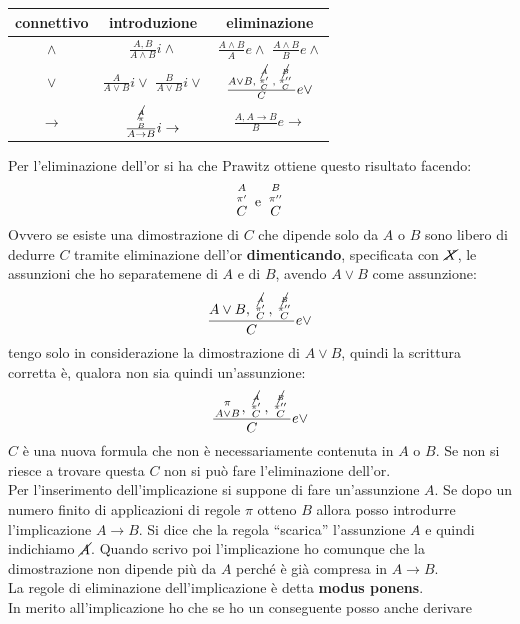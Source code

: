 \documentclass[a4paper,12pt, oneside]{book}
\newcommand*{\bfrac}[2]{\genfrac{}{}{0pt}{}{#1}{#2}}
\begin{document}
\begin{table}[H]
  \Large
  \centering
  \begin{tabular}{c||c|c}
    connettivo& introduzione & eliminazione\\
    \hline
    \hline
    $\land$ & $\frac{A,B}{A\land B}i\land$&$\frac{A\land B}{A}e\land$
                                            $\frac{A\land B}{B}e\land$\\
    \hline
    $\lor$ &$\frac{A}{A\lor B}i\lor$
             $\frac{B}{A\lor B}i\lor$&$\frac{A\lor B,
                                       \bfrac{\bfrac{\cancel{A}}{\pi'}}{C},
                                       \bfrac{\bfrac{\cancel{B}}{\pi''}}{C}}{C}
                                       e\lor$\\
    \hline
    $\to$ & $\frac{\bfrac{\cancel{A}}
            {\bfrac{\pi}{B}}}{A\to B}i\to$ & $\frac{A,A\to B}{B}e\to$\\
    \hline
  \end{tabular}
\end{table}
Per l'eliminazione dell'or si ha che Prawitz ottiene questo risultato facendo:
\[\bfrac{\bfrac{A}{\pi'}}{C}\mbox{ e }\bfrac{\bfrac{B}{\pi''}}{C}\]
Ovvero se esiste una dimostrazione di $C$ che dipende solo da $A$ o $B$ sono
libero di dedurre $C$ tramite eliminazione dell'or \textbf{dimenticando},
specificata con $\cancel{X}$, le
assunzioni che ho separatemene di $A$ e di $B$, avendo $A\lor B$ come
assunzione: 
\[\frac{A\lor B,\bfrac{\bfrac{\cancel{A}}{\pi'}}{C},
    \bfrac{\bfrac{\cancel{B}}{\pi''}}{C}}{C}e\lor\]
tengo solo in considerazione la dimostrazione di $A\lor B$, quindi la scrittura
corretta è, qualora non sia quindi un'assunzione:
\[\frac{\bfrac{\pi}{A\lor B},\bfrac{\bfrac{\cancel{A}}{\pi'}}{C},
    \bfrac{\bfrac{\cancel{B}}{\pi''}}{C}}{C}e\lor\]
$C$ è una nuova formula che non è necessariamente contenuta in $A$ o $B$. Se non
si riesce a trovare questa $C$ non si può fare l'eliminazione dell'or.\\
Per l'inserimento dell'implicazione si suppone di fare un'assunzione $A$. Se
dopo un numero finito di applicazioni di regole $\pi$ otteno $B$ allora posso
introdurre l'implicazione $A\to B$. Si dice che la regola ``scarica''
l'assunzione $A$ e quindi indichiamo $\cancel{A}$. Quando scrivo poi
l'implicazione ho comunque che la dimostrazione non dipende più da $A$ perché è
già compresa in $A\to B$.\\
La regole di eliminazione dell'implicazione è detta \textbf{modus ponens}.\\
In merito all'implicazione ho che se ho un conseguente posso anche derivare
\end{document}
